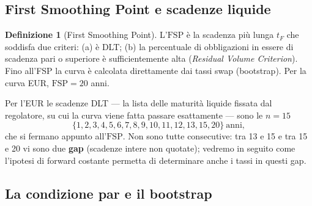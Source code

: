 \documentclass[11pt,a4paper]{article}
\theoremstyle{plain}
\theoremstyle{definition}
\newtheorem{definizione}[teorema]{Definizione}
\theoremstyle{remark}
\newcommand{\FSP}{\mathrm{FSP}}
\begin{document}
\subsection{First Smoothing Point e scadenze liquide}
\label{sec:fsp-dlt}

\begin{definizione}[First Smoothing Point]
\label{def:fsp}
L'$\FSP$ \`e la scadenza pi\`u lunga $t_F$ che soddisfa due criteri: (a) \`e DLT; (b) la
percentuale di obbligazioni in essere di scadenza pari o superiore \`e sufficientemente alta
(\emph{Residual Volume Criterion}). Fino all'FSP la curva \`e calcolata direttamente dai tassi
swap (bootstrap). Per la curva EUR, $\FSP=20$ anni.
\end{definizione}

Per l'EUR le scadenze DLT --- la lista delle maturit\`a liquide fissata dal regolatore, su cui
la curva viene fatta passare esattamente --- sono le $n=15$
\[
  \{1,2,3,4,5,6,7,8,9,10,11,12,13,15,20\}\ \text{anni},
\]
che si fermano appunto all'$\FSP$. Non sono tutte consecutive: tra 13 e 15 e tra 15 e 20 vi
sono due \textbf{gap} (scadenze intere non quotate); vedremo in seguito come l'ipotesi di
forward costante permetta di determinare anche i tassi in questi gap.
\subsection{La condizione par e il bootstrap}
\label{sec:bootstrap}
\end{document}
